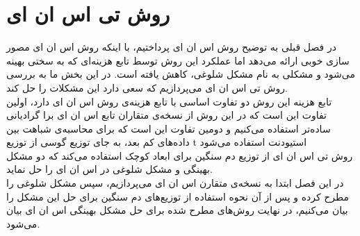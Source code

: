 \chapter{
روش تی اس ان ای
}
در فصل قبلی به توضیح روش اس ان ای پرداختیم، با اینکه روش اس ان ای مصور سازی خوبی ارائه می‌دهد اما عملکرد این روش توسط تابع هزینه‌ای که به سختی بهینه می‌شود و مشکلی به نام مشکل شلوغی، کاهش یافته است.
در این بخش ما به بررسی روش تی اس ان ای می‌پردازیم که سعی دارد این مشکلات را حل کند.
\\
تابع هزینه این روش دو تفاوت اساسی با تابع هزینه‌ی روش اس ان ای دارد، اولین تفاوت این است که در این روش از نسخه‌ی متقاران تابع اس ان ای برا گرادیانی ساده‌تر استفاده می‌کنیم و دومین تفاوت این است که برای محاسبه‌ی شباهت بین داده‌های کم بعد، به جای توزیع گوسی از
 {توزیع t استیودنت}
استفاده می‌شود
\\
روش تی اس ان ای از توزیع‌
 {دم سنگین}
برای ابعاد کوچک استفاده می‌کند که دو مشکل بهینگی و مشکل شلوغی در اس ان ای را حل نماید.
\\
در این فصل ابتدا به نسخه‌ی متقارن اس ان ای می‌پردازیم، سپس مشکل شلوغی را مطرح کرده و پس از آن نحوه استفاده از توزیع‌های دم سنگین برای حل این مشکل را بیان می‌کنیم، در نهایت روش‌های مطرح شده برای حل مشکل بهینگی اس ان ای بیان می‌شود.
